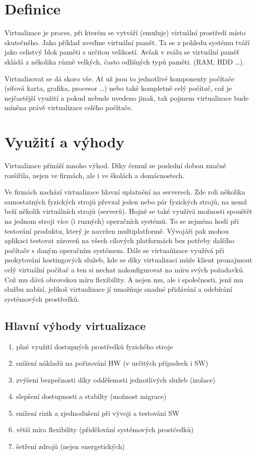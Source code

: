 \section{Definice}
Virtualizace je proces, při kterém se vytváří (emuluje) virtuální prostředí místo skutečného. Jako příklad uveďme virtuální pamět. Ta se z pohledu systému tváří jako celistvý blok paměti s určitou velikostí. Avšak v reálu se virtuální paměť skládá z několika různě velkých, často odlišných typů paměti. (RAM, HDD \dots).

Virtualizovat se dá skoro vše. Ať už jsou to jednotlivé komponenty počítače (síťová karta, grafika, procesor \dots) nebo také kompletně celý počítač, což je nejčastější využití a pokud nebude uvedeno jinak, tak pojmem virtualizace bude míněna právě virtualizace celého počítače.
\section{Využití a výhody}
Virtualizace přináší mnoho výhod. Díky čemuž se poslední dobou značně rozšířila, nejen ve firmách, ale i ve školách a domácnostech.

Ve firmách nachází virtualizace hlavní uplatnění na serverech. Zde roli několika samostatných fyzických strojů převzal jeden nebo pár fyzických strojů, na nemž beží několik virtuálních strojů (serverů). Hojně se také využívá možnosti spouštět na jednom stroji více (i ruzných) operačních systémů. To se zejména hodí při testování produktu, který je navržen multiplatformě. Vývojáři pak mohou aplikaci testovat zároveň na všech cílových platformách bez potřeby dalšího počítače s daným operačním systémem. Dále se virtuaůizace využívá při psokytování hostingových služeb, kde se díky virtualizaci může klient pronajmout celý virtuální počítač a ten si nechat nakonfigurovat na míru svých požadavků. Což mu dává obrovskou míru flexibility. A nejen mu, ale i společnosti, jenž mu službu nabízí, jelikož virtualizace jí umožňuje snadné přidávání a odebírání systémových prostředků.

\subsection*{Hlavní výhody virtualizace}
\begin{enumerate}
  \item plné využití dostupných prostředků fyzického stroje
  \item snížení nákladů na pořizování HW (v určitých případech i SW)
  \item zvýšení bezpečnosti díky oddělenosti jednotlivých služeb (izolace)
  \item slepšení dostupnosti a stabilty (možnost migrace)
  \item snížení rizik a zjednodušení při vývoji a testování SW
  \item větší míra flexibility (přidělování systémových prostčedků)
  \item šetření zdrojů (nejen energetických)
\end{enumerate}
